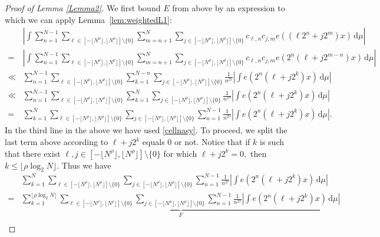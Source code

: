 \documentclass[10pt,a4paper]{amsart}
\numberwithin{equation}{section} %
\begin{document}
\begin{proof}[Proof of Lemma \ref{Lemma2}]
We first bound $E$ from above by an expression to which we can apply Lemma~\ref{lem:weightedL1}:
	\begin{align*}
		&\left|\int \sum_{n=1}^{N-1}\sum_{\ell\in [-\lfloor N^{\rho}\rfloor,\lfloor N^{ \rho}\rfloor]\setminus\{0\}}\sum_{m=n+1}^{N}\sum_{j\in [-\lfloor N^{\rho}\rfloor,\lfloor N^{ \rho}\rfloor]\setminus\{0\}}c_{\ell,n}c_{j,m}e((\ell 2^n+j2^m)x)\, \mathrm{d}\mu\right| \\
		=&\left|\int \sum_{n=1}^{N-1}\sum_{\ell\in [-\lfloor N^{\rho}\rfloor,\lfloor N^{ \rho}\rfloor]\setminus\{0\}}\sum_{m=n+1}^{N}\sum_{j\in [-\lfloor N^{\rho}\rfloor,\lfloor N^{ \rho}\rfloor]\setminus\{0\}}c_{\ell,n}c_{j,m}e(2^{n}(\ell+j2^{m-n})x)\, \mathrm{d}\mu\right|\\
		\ll & \sum_{n=1}^{N-1}\sum_{\ell\in [-\lfloor N^{\rho}\rfloor,\lfloor N^{ \rho}\rfloor]\setminus\{0\}}\sum_{k=1}^{N-n}\sum_{j\in [-\lfloor N^{ \rho}\rfloor,\lfloor N^{ \rho}\rfloor]\setminus\{0\}}\frac{1}{n^{2\tau}}\left|\int e(2^{n}(\ell+j2^k)x)\, \mathrm{d}\mu\right|\\
		\ll & \sum_{n=1}^{N-1}\sum_{\ell\in [-\lfloor N^{\rho}\rfloor,\lfloor 
        N^{\rho}\rfloor]\setminus\{0\}}\sum_{k=1}^{N}\sum_{j\in [-\lfloor N^{\rho}\rfloor,\lfloor 
        N^{\rho}\rfloor]\setminus\{0\}}\frac{1}{n^{2\tau}}\left|\int e(2^{n}(\ell+j2^k)x)\, \mathrm{d}\mu\right|\\
		= & \sum_{k=1}^{N}\sum_{\ell\in [-\lfloor 
        N^{\rho}\rfloor,\lfloor 
        N^{\rho}\rfloor]\setminus\{0\}} \sum_{j\in [-\lfloor N^{\rho}\rfloor,\lfloor 
        N^{\rho}\rfloor]\setminus\{0\}} \sum_{n=1}^{N-1}\frac{1}{n^{2\tau}}\left|\int e(2^{n}(\ell+j2^k)x)\, \mathrm{d}\mu\right|.
	\end{align*}
	In the third line in the above we have used \eqref{cellnasy}. To proceed, we split the last term above according to $\ell+j2^k$ equals $0$ or not. Notice that if $k$ is such that there exist $\ell,j\in [-\lfloor 
    N^{\rho}\rfloor,\lfloor N^{\rho}\rfloor]\setminus\{0\}$ for which $\ell+j2^{k}=0,$ then $k\leq \lfloor\rho\log_{2}N \rfloor$. Thus we have
	\begin{align*}
		&\sum_{k=1}^{N}\sum_{\ell \in [-\lfloor N^{ \rho}\rfloor,\lfloor N^{ \rho}\rfloor]\setminus\{0\}}\sum_{j\in [-\lfloor N^{\rho}\rfloor,\lfloor N^{ \rho}\rfloor]\setminus\{0\}} \sum_{n=1}^{N-1}\frac{1}{n^{2\tau}}\left|\int e(2^{n}(\ell+j2^k)x)\, \mathrm{d}\mu\right|\\
 =&\underbrace{\sum_{k=1}^{\lfloor\rho\log_{2}N \rfloor}\sum_{\ell\in [-\lfloor N^{ \rho}\rfloor,\lfloor N^{ \rho}\rfloor]\setminus\{0\}}\sum_{j\in [-\lfloor N^{ \rho}\rfloor,\lfloor N^{ \rho}\rfloor]\setminus\{0\}} \sum_{n=1}^{N-1}\frac{1}{n^{2\tau}}\left|\int e(2^{n}(\ell+j2^k)x)\, \mathrm{d}\mu\right|}_{F}\\

\end{align*}
\end{proof}
\end{document}
